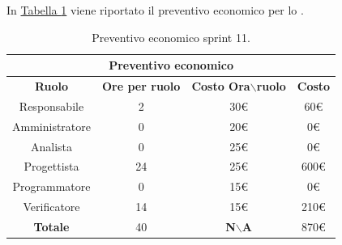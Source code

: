 In \hyperref[tab:sprint11_preventivo_economico]{Tabella \ref{tab:sprint11_preventivo_economico}} viene riportato il preventivo economico per lo .
\begin{table}[H]
    \centering
    \begin{tabular}{|c|c|c|c|}
        \hline
            \multicolumn{4}{|c|}{\textbf{Preventivo economico}} \\ 
        \hline
            \textbf{Ruolo} & \textbf{Ore per ruolo} & \textbf{Costo Ora$\backslash$ruolo} & \textbf{Costo} \\
        \hline
        Responsabile & 2 & 30€ & 60€ \\
        \hline
        Amministratore & 0 & 20€ & 0€ \\
        \hline
        Analista & 0 & 25€ & 0€ \\
        \hline
        Progettista & 24 & 25€ & 600€ \\
        \hline
        Programmatore & 0 & 15€ & 0€ \\
        \hline
        Verificatore & 14 & 15€ & 210€ \\
        \hline 
        \textbf{Totale} & 40 & \textbf{N$\backslash$A} & 870€  \\
        \hline
    \end{tabular}
    \caption{Preventivo economico sprint 11.}
    \label{tab:sprint11_preventivo_economico}
\end{table}